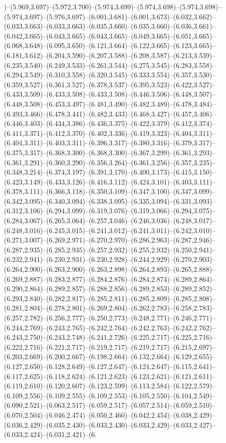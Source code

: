 )--(5.969,3.697)--(5.972,3.700)--(5.974,3.699)--(5.974,3.698)--(5.974,3.698)--(5.974,3.697)--(5.976,3.697)--(6.001,3.681)--(6.001,3.673)--(6.032,3.662)--(6.033,3.663)--(6.033,3.663)--(6.035,3.660)--(6.035,3.660)--(6.036,3.661)--(6.042,3.665)--(6.043,3.665)--(6.043,3.665)--(6.049,3.665)--(6.051,3.665)--(6.068,3.648)--(6.095,3.650)--(6.121,3.664)--(6.122,3.665)--(6.123,3.665)--(6.181,3.612)--(6.204,3.590)--(6.207,3.588)--(6.208,3.587)--(6.213,3.539)--(6.235,3.540)--(6.249,3.533)--(6.261,3.544)--(6.275,3.545)--(6.283,3.558)--(6.294,3.549)--(6.310,3.558)--(6.320,3.545)--(6.333,3.554)--(6.357,3.530)--(6.359,3.527)--(6.361,3.527)--(6.378,3.537)--(6.395,3.523)--(6.422,3.527)--(6.433,3.509)--(6.433,3.508)--(6.433,3.508)--(6.446,3.506)--(6.448,3.507)--(6.448,3.508)--(6.453,3.497)--(6.481,3.490)--(6.482,3.489)--(6.478,3.484)--(6.493,3.466)--(6.478,3.441)--(6.482,3.433)--(6.468,3.427)--(6.457,3.406)--(6.446,3.403)--(6.434,3.386)--(6.436,3.375)--(6.422,3.379)--(6.412,3.374)--(6.411,3.371)--(6.412,3.370)--(6.402,3.336)--(6.419,3.323)--(6.404,3.311)--(6.404,3.311)--(6.403,3.311)--(6.396,3.317)--(6.380,3.316)--(6.379,3.317)--(6.375,3.317)--(6.368,3.300)--(6.368,3.300)--(6.367,3.299)--(6.361,3.293)--(6.361,3.291)--(6.360,3.290)--(6.356,3.264)--(6.361,3.256)--(6.357,3.235)--(6.348,3.214)--(6.374,3.197)--(6.391,3.170)--(6.400,3.173)--(6.415,3.150)--(6.423,3.149)--(6.433,3.126)--(6.416,3.112)--(6.424,3.101)--(6.403,3.111)--(6.378,3.111)--(6.366,3.118)--(6.350,3.109)--(6.347,3.100)--(6.347,3.099)--(6.342,3.095)--(6.340,3.094)--(6.338,3.095)--(6.335,3.094)--(6.331,3.093)--(6.312,3.106)--(6.294,3.099)--(6.319,3.076)--(6.319,3.066)--(6.294,3.075)--(6.284,3.067)--(6.265,3.064)--(6.257,3.046)--(6.246,3.036)--(6.248,3.017)--(6.248,3.016)--(6.245,3.015)--(6.241,3.012)--(6.241,3.011)--(6.242,3.010)--(6.271,3.007)--(6.269,2.971)--(6.270,2.970)--(6.286,2.963)--(6.287,2.946)--(6.287,2.935)--(6.285,2.935)--(6.257,2.932)--(6.255,2.932)--(6.250,2.941)--(6.232,2.941)--(6.230,2.931)--(6.230,2.928)--(6.244,2.929)--(6.270,2.903)--(6.264,2.900)--(6.263,2.900)--(6.263,2.898)--(6.264,2.893)--(6.265,2.888)--(6.269,2.887)--(6.283,2.877)--(6.284,2.876)--(6.284,2.874)--(6.289,2.864)--(6.290,2.864)--(6.289,2.857)--(6.288,2.856)--(6.289,2.853)--(6.289,2.852)--(6.293,2.840)--(6.282,2.817)--(6.285,2.811)--(6.285,2.809)--(6.285,2.808)--(6.281,2.804)--(6.278,2.801)--(6.269,2.804)--(6.262,2.783)--(6.258,2.783)--(6.257,2.782)--(6.256,2.777)--(6.250,2.773)--(6.248,2.771)--(6.246,2.771)--(6.244,2.769)--(6.243,2.765)--(6.242,2.764)--(6.242,2.763)--(6.242,2.762)--(6.243,2.750)--(6.243,2.748)--(6.241,2.726)--(6.225,2.717)--(6.225,2.716)--(6.222,2.716)--(6.221,2.717)--(6.219,2.717)--(6.219,2.717)--(6.215,2.697)--(6.203,2.669)--(6.200,2.667)--(6.198,2.664)--(6.132,2.664)--(6.129,2.655)--(6.127,2.650)--(6.128,2.649)--(6.127,2.647)--(6.124,2.647)--(6.115,2.641)--(6.117,2.625)--(6.118,2.624)--(6.121,2.623)--(6.123,2.621)--(6.121,2.611)--(6.119,2.610)--(6.120,2.607)--(6.123,2.599)--(6.113,2.584)--(6.122,2.579)--(6.109,2.556)--(6.109,2.555)--(6.109,2.553)--(6.105,2.550)--(6.104,2.549)--(6.090,2.521)--(6.063,2.517)--(6.059,2.517)--(6.057,2.514)--(6.059,2.510)--(6.070,2.504)--(6.046,2.474)--(6.050,2.460)--(6.042,2.454)--(6.038,2.429)--(6.036,2.429)--(6.035,2.430)--(6.033,2.430)--(6.033,2.429)--(6.033,2.427)--(6.033,2.424)--(6.031,2.421)--(6.